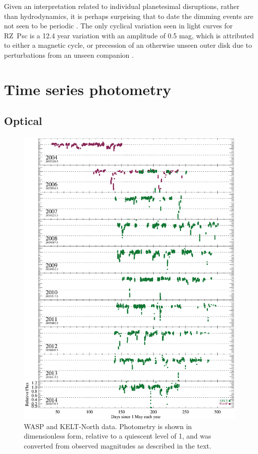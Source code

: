 \documentclass[]{rsos}
\begin{document}
Given an interpretation related to individual planetesimal disruptions, rather than
hydrodynamics, it is perhaps surprising that to date the dimming events are not seen to
be periodic \cite{1999AstL...25..243R,2013A&A...553L...1D}. The only cyclical variation
seen in light curves for RZ~Psc is a 12.4 year variation with an amplitude of 0.5 mag,
which is attributed to either a magnetic cycle, or precession of an otherwise unseen
outer disk due to perturbations from an unseen companion \cite{2013A&A...553L...1D}.

\section{Time series photometry}\label{s:data}

\subsection{Optical}\label{ss:opt}

\begin{figure}
  \begin{center}
    \hspace{-0.5cm} \includegraphics[width=\textwidth]{figs/yearly-2004.eps}
    \caption{WASP and KELT-North data. Photometry is shown in dimensionless form,
      relative to a quiescent level of 1, and was converted from observed magnitudes as
      described in the text.}\label{fig:waspkelt}
  \end{center}
\end{figure}
\end{document}
